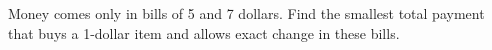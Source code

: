 Money comes only in bills of 5 and 7 dollars. Find the smallest total payment that buys a 1-dollar item and allows exact change in these bills.
